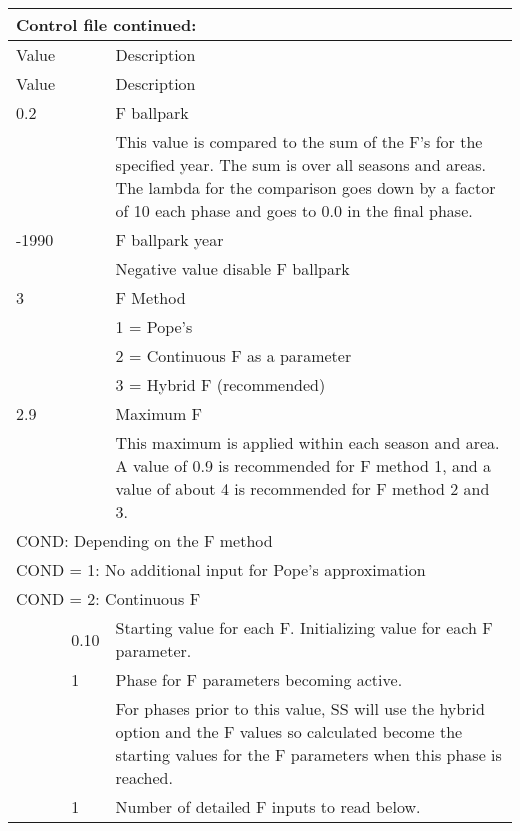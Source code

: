\begin{center}
		\begin{longtable}{p{1cm} p{3cm} p{11.3cm}}
			\multicolumn{3}{l}{Control file continued:}\\
			\hline
			Value &   &  Description\\
			\hline
			\endfirsthead

			\hline
			Value &  &  Description\\
			\hline
			\endhead

			\endfoot
			\endlastfoot

			0.2 & & F ballpark\\
			    & & This value is compared to the sum of the F’s for the specified year.  The sum is over all seasons and areas.  The lambda for the comparison goes down by a factor of 10 each phase and goes to 0.0 in the final phase.\\
		   \hline
			-1990 & & F ballpark year \\
			      & & Negative value disable F ballpark \\
		   \hline
			 3  & & F Method \\
			    & & 1 = Pope's \\
			    & & 2 = Continuous F as a parameter \\
			    & & 3 = Hybrid F (recommended)\\
		   \hline
		   2.9 & & Maximum F \\
		       & & This maximum is applied within each season and area.   A value of 0.9 is recommended for F method 1, and a value of about 4 is recommended for F method 2 and 3. \\
		   \hline
		   \multicolumn{3}{l}{COND: Depending on the F method} \\
		   \hline
		   \multicolumn{3}{l}{COND = 1: No additional input for Pope's approximation}\\
		   \hline
		   \multicolumn{3}{l}{COND = 2: Continuous F}\\
		   & 0.10 & Starting value for each F.  Initializing value for each F parameter.\\
		   & 1 & Phase for F parameters becoming active.  \\
		   &   & For phases prior to this value,  SS will use the hybrid option and the F values so calculated become the starting values for the F parameters when this phase is reached.\\
		   & 1 & Number of detailed F inputs to read below. \\
		   \hline

\end{longtable}
\end{center}
